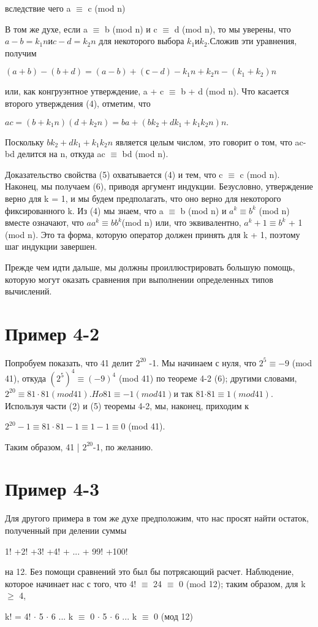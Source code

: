 \documentclass[11pt]{article}
\begin{document}
	вследствие чего a $\equiv$ c (mod n)
	
	В том же духе, если a $\equiv$ b (mod n) и c $\equiv$ d (mod n), то мы уверены, что $a-b = k_{1}n и c-d = k_{2}n$ для некоторого выбора $k_{1} и k_{2}. $Сложив эти уравнения, получим
	
	\begin{center}
		$(a + b) - (b + d) = (a-b) + (с-d) -k_{1}n + k_{2}n- (k_{1} + k_{2}) n$
	\end{center}
	или, как конгруэнтное утверждение, a + c  $\equiv$ b + d (mod n). Что касается второго утверждения (4), отметим, что
	\begin{center}
		$ ac = (b + k_{1} n) (d + k_{2}n) = ba + (bk_{2} + dk_{1} + k_{1}k_{2}n) n.$
	\end{center}
	Поскольку $bk_{2} + dk_{1} + k_{1}k_2n$ является целым числом, это говорит о том, что ac-bd делится на n, откуда ac $\equiv$ bd (mod n).
	
	Доказательство свойства (5) охватывается (4) и тем, что c $\equiv$ c (mod n). Наконец, мы получаем (6), приводя аргумент индукции. Безусловно, утверждение верно для k = 1, и мы будем предполагать, что оно верно для некоторого фиксированного k. Из (4) мы знаем, что a $\equiv$ b (mod n) и $a^{k} \equiv b^{k}$ (mod n) вместе означают, что $aa^{k} \equiv bb^{k} $(mod n) или, что эквивалентно, $a^{k} + 1 \equiv b^{k}$ + 1 (mod n). Это та форма, которую оператор должен принять для k + 1, поэтому шаг индукции завершен.
	
	Прежде чем идти дальше, мы должны проиллюстрировать большую помощь, которую могут оказать сравнения при выполнении определенных типов вычислений.
	\section{Пример 4-2}
	Попробуем показать, что 41 делит $2^{20}$ -1. Мы начинаем с нуля, что $2^{5} \equiv - 9$ (mod 41), откуда $(2^{5})^{4} \equiv (- 9)^{4}$ (mod 41) по теореме 4-2 (6); другими словами,$ 2^{20} \equiv 81 \cdot 81 (mod 41). Ho 81 \equiv - 1 (mod 41) $и так 81$ \cdot 81 \equiv 1 (mod 41).$ Используя части (2) и (5) теоремы 4-2, мы, наконец, приходим к
	
	\begin{center}
		$2^{20}-1 \equiv 81 \cdot 81-1 \equiv 1-1 \equiv 0$ (mod 41).
	\end{center}
	Таким образом, 41 | $2^{20}$-1, по желанию.
	\section{Пример 4-3}
	Для другого примера в том же духе предположим, что нас просят найти остаток, полученный при делении суммы
	\begin{center}
		1! +2! +3! +4! + ... + 99! +100!
	\end{center}
	на 12. Без помощи сравнений это был бы потрясающий расчет. Наблюдение, которое начинает нас с того, что 4! $\equiv$ 24 $\equiv$ 0 (mod 12); таким образом, для k$\geq$ 4,
	\begin{center}
		k! = 4! $\cdot$ 5 $\cdot$ 6 ... k $\equiv$ 0 $\cdot$ 5 $\cdot$ 6 ... k $\equiv$ 0
		(мод 12)
	\end{center}
	
	
	
\end{document}
